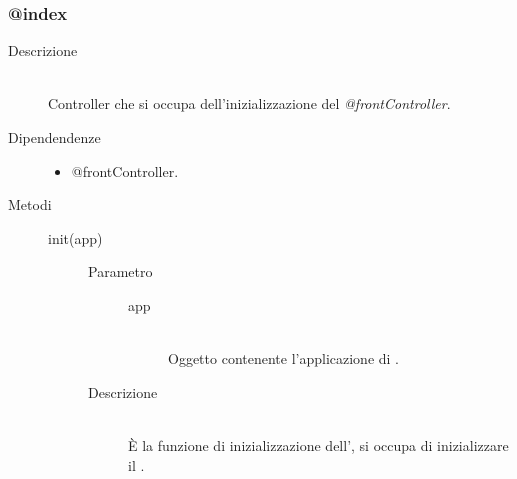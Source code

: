 \subsubsection{@index}
\begin{description}
 \item[Descrizione] \hfill \\
  Controller che si occupa dell'inizializzazione del \textit{@frontController}.
 \item[Dipendendenze] \hfill
 \begin{itemize}
 \item @frontController.
 \end{itemize}
 \item[Metodi] \hfill
  \begin{description}
    \item[init(app)]\hfill 
    \begin{description}
           		\item[Parametro] \hfill
           			\begin{description}
           				\item[app] \hfill \\
           				Oggetto contenente l'applicazione di .
           			\end{description}
           		\item[Descrizione] \hfill \\
           		\`{E} la funzione di inizializzazione dell', si occupa di inizializzare il .
       \end{description}
  	
  \end{description}
\end{description}

